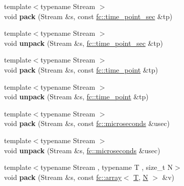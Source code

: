 \begin{DoxyCompactItemize}
\item 
\mbox{\label{namespacefc_1_1raw_a2c8b2fb77a4b62e79019ac70f9f7f8b7}} 
{\footnotesize template$<$typename Stream $>$ }\\void {\bfseries pack} (Stream \&s, const \mbox{\hyperlink{classfc_1_1time__point__sec}{fc\+::time\+\_\+point\+\_\+sec}} \&tp)
\item 
\mbox{\label{namespacefc_1_1raw_abc5faea01ee805ad5c1cff20e6d88b31}} 
{\footnotesize template$<$typename Stream $>$ }\\void {\bfseries unpack} (Stream \&s, \mbox{\hyperlink{classfc_1_1time__point__sec}{fc\+::time\+\_\+point\+\_\+sec}} \&tp)
\item 
\mbox{\label{namespacefc_1_1raw_af86d2f0841518cf3bad8927cdbdb423a}} 
{\footnotesize template$<$typename Stream $>$ }\\void {\bfseries pack} (Stream \&s, const \mbox{\hyperlink{classfc_1_1time__point}{fc\+::time\+\_\+point}} \&tp)
\item 
\mbox{\label{namespacefc_1_1raw_a698aa730f0edf6aa582932ec8e5c557a}} 
{\footnotesize template$<$typename Stream $>$ }\\void {\bfseries unpack} (Stream \&s, \mbox{\hyperlink{classfc_1_1time__point}{fc\+::time\+\_\+point}} \&tp)
\item 
\mbox{\label{namespacefc_1_1raw_a162be70f18635ba06ce6abaa599403bd}} 
{\footnotesize template$<$typename Stream $>$ }\\void {\bfseries pack} (Stream \&s, const \mbox{\hyperlink{classfc_1_1microseconds}{fc\+::microseconds}} \&usec)
\item 
\mbox{\label{namespacefc_1_1raw_a0d2809138c3498bdab26f871fae8a8cb}} 
{\footnotesize template$<$typename Stream $>$ }\\void {\bfseries unpack} (Stream \&s, \mbox{\hyperlink{classfc_1_1microseconds}{fc\+::microseconds}} \&usec)
\item 
\mbox{\label{namespacefc_1_1raw_a4272b532f7af2dabad62a88784e4c886}} 
{\footnotesize template$<$typename Stream , typename T , size\+\_\+t N$>$ }\\void {\bfseries pack} (Stream \&s, const \mbox{\hyperlink{classfc_1_1array}{fc\+::array}}$<$ \mbox{\hyperlink{struct_t}{T}}, \mbox{\hyperlink{group__types_gaf9c1edb0e0da55ec6ba09f32f6839529}{N}} $>$ \&v)

\end{DoxyCompactItemize}
